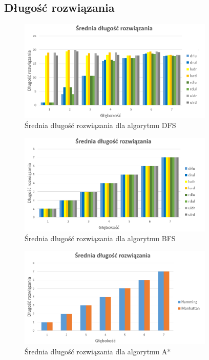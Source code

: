 \documentclass{classrep}
\begin{document}
\newpage
\subsection{Długość rozwiązania}
\begin{figure}[h!]
    \centering
    \includegraphics[width=0.83\textwidth]{sredniaDFS.png}
    \caption{Średnia długość rozwiązania dla algorytmu DFS}
	\label{sredniaDFS}
\end{figure}
\begin{figure}[h!]
    \centering
    \includegraphics[width=0.83\textwidth]{sredniaBFS.png}
    \caption{Średnia długość rozwiązania dla algorytmu BFS}
	\label{sredniaBFS}
\end{figure}
\begin{figure}[h!]
    \centering
    \includegraphics[width=0.83\textwidth]{sredniaastr.png}
    \caption{Średnia długość rozwiązania dla algorytmu A*}
	\label{sredniaASTR}
\end{figure}
\end{document}
